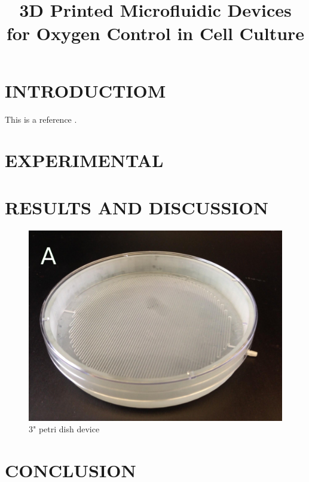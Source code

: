 \documentclass{article}
\title{3D Printed Microfluidic Devices for Oxygen Control in Cell Culture}
\begin{document}
\maketitle

\section{INTRODUCTIOM}

This is a reference \cite{Au2014}.

\section{EXPERIMENTAL}

\section{RESULTS AND DISCUSSION}

\begin{figure}[h!]
\centering
\includegraphics[scale=1.7]{3-inch-well-photo.png}
\caption{3" petri dish device}
\label{fig:3-inch-well-photo}
\end{figure}

\section{CONCLUSION}



\end{document}
